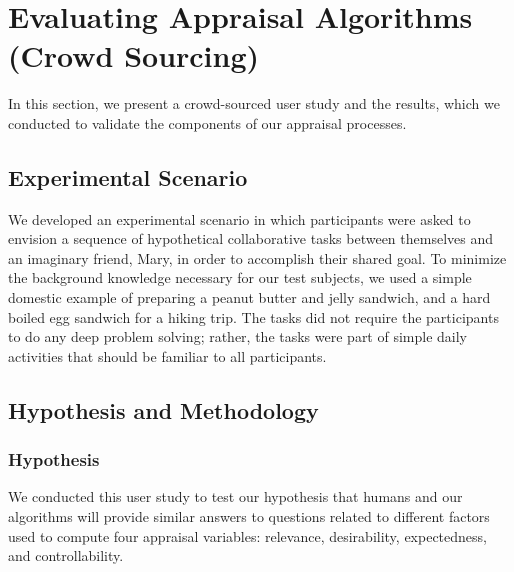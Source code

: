 \documentclass[12pt]{report}
\begin{document}
\section{Evaluating Appraisal Algorithms (Crowd Sourcing)}
\label{sec:crowd-sourcing}
In this section, we present a crowd-sourced user study and the results, which
we conducted to validate the components of our appraisal processes.

\subsection{Experimental Scenario}
We developed an experimental scenario in which participants were asked to
envision a sequence of hypothetical collaborative tasks between themselves and
an imaginary friend, Mary, in order to accomplish their shared goal. To minimize
the background knowledge necessary for our test subjects, we used a simple
domestic example of preparing a peanut butter and jelly sandwich, and a hard
boiled egg sandwich for a hiking trip. The tasks did not require the
participants to do any deep problem solving; rather, the tasks were part of
simple daily activities that should be familiar to all participants. 
% 
% 

\subsection{Hypothesis and Methodology}

\subsubsection{Hypothesis}
We conducted this user study to test our hypothesis that humans and our
algorithms will provide similar answers to questions related to different
factors used to compute four appraisal variables: relevance, desirability,
expectedness, and controllability.
\end{document}
